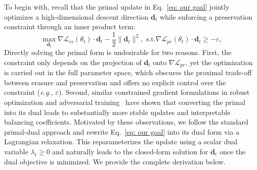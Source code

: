 To begin with, recall that the primal update in Eq.~\ref{eq: our goal} jointly optimizes a high-dimensional descent direction $\mathbf{d}_t$ while enforcing a preservation constraint through an inner product term:
\begin{equation}
    \max_{\mathbf{d}_t} \nabla \mathcal{L}_{er}(\theta_t) \cdot \mathbf{d}_t - \frac{1}{2}\|\mathbf{d}_t\|^2 
    , \,\,
    \text{s.t.} \nabla \mathcal{L}_{pr}(\theta_t) \cdot \mathbf{d}_t \ge -\varepsilon,
\end{equation}
Directly solving the primal form is undesirable for two reasons. First, the constraint only depends on the projection of $\mathbf{d}_t$ onto $\nabla \mathcal{L}_{pr}$, yet the optimization is carried out in the full parameter space, which obscures the proximal trade-off between erasure and preservation and offers no explicit control over the constraint (\textit{e.g.}, $\varepsilon$). Second, similar constrained gradient formulations in robust optimization and adversarial training~\cite{sener2019multitasklearningmultiobjectiveoptimization, yu2020gradientsurgerymultitasklearning, eupmu} have shown that converting the primal into its dual leads to substantially more stable updates and interpretable balancing coefficients. Motivated by these observations, we follow the standard primal-dual approach and rewrite Eq.~\ref{eq: our goal} into its dual form via a Lagrangian relaxation. This reparameterizes the update using a scalar dual variable $\lambda_t \ge 0$ and naturally leads to the closed-form solution for $\mathbf{d}_t$ once the dual objective is minimized. We provide the complete derivation below.
